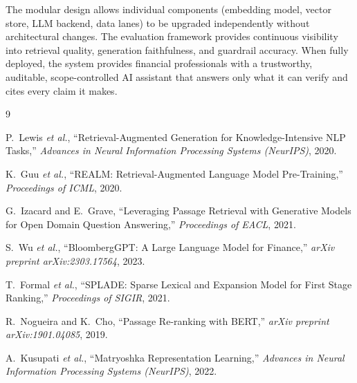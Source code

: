 \documentclass[10pt,a4paper,twocolumn]{article}
\begin{document}
The modular design allows individual components (embedding model, vector store, LLM backend,
data lanes) to be upgraded independently without architectural changes. The evaluation
framework provides continuous visibility into retrieval quality, generation faithfulness, and
guardrail accuracy. When fully deployed, the system provides financial professionals with a
trustworthy, auditable, scope-controlled AI assistant that answers only what it can verify
and cites every claim it makes.

\begin{thebibliography}{9}
\small

P.\ Lewis \textit{et al.},
``Retrieval-Augmented Generation for Knowledge-Intensive NLP Tasks,''
\textit{Advances in Neural Information Processing Systems (NeurIPS)}, 2020.

K.\ Guu \textit{et al.},
``REALM: Retrieval-Augmented Language Model Pre-Training,''
\textit{Proceedings of ICML}, 2020.

G.\ Izacard and E.\ Grave,
``Leveraging Passage Retrieval with Generative Models for Open Domain Question Answering,''
\textit{Proceedings of EACL}, 2021.

S.\ Wu \textit{et al.},
``BloombergGPT: A Large Language Model for Finance,''
\textit{arXiv preprint arXiv:2303.17564}, 2023.

T.\ Formal \textit{et al.},
``SPLADE: Sparse Lexical and Expansion Model for First Stage Ranking,''
\textit{Proceedings of SIGIR}, 2021.

R.\ Nogueira and K.\ Cho,
``Passage Re-ranking with BERT,''
\textit{arXiv preprint arXiv:1901.04085}, 2019.

A.\ Kusupati \textit{et al.},
``Matryoshka Representation Learning,''
\textit{Advances in Neural Information Processing Systems (NeurIPS)}, 2022.

\end{thebibliography}
\end{document}
